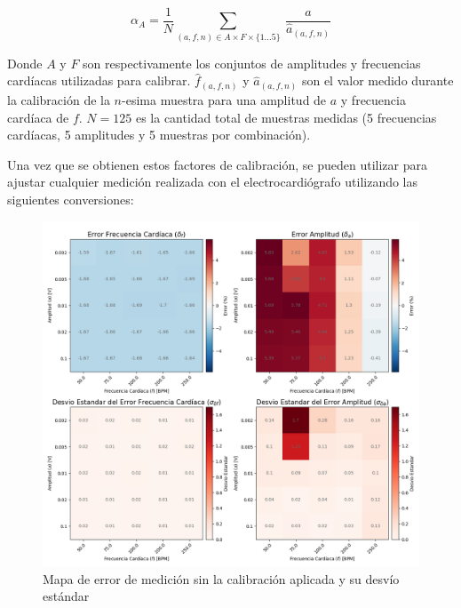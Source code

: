 \documentclass[conference]{IEEEtran}
\begin{document}
\begin{equation}
\alpha_{A} = \dfrac{1}{N} \sum_{(a,f,n) \in A \times F \times \{1...5 \}}
\nolimits ~ \frac{a}{\hat{a}_{(a,f,n)}}
\label{eqn:alpha_a}
\end{equation}



Donde $A$ y $F$ son respectivamente los conjuntos de amplitudes y frecuencias
cardíacas utilizadas para calibrar. $\hat{f}_{(a,f,n)}$ y $\hat{a}_{(a,f,n)}$
son el valor medido durante la calibración de la $n$-esima muestra para una
amplitud de $a$ y frecuencia cardíaca de $f$. $N=125$ es la cantidad total de
muestras medidas (5 frecuencias cardíacas, 5 amplitudes y 5 muestras por
combinación).

Una vez que se obtienen estos factores de calibración, se pueden utilizar para
ajustar cualquier medición realizada con el electrocardiógrafo utilizando las
siguientes conversiones:
 
\begin{figure}[t]
    \centering
    \includegraphics[width=\textwidth]{figs/calib_error_map.png}
    \caption{Mapa de error de medición sin la calibración aplicada y su desvío 
    estándar}
    \label{fig:plot_error_sin_calib}
\end{figure}
\end{document}
